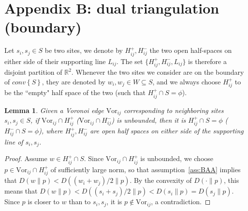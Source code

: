 \documentclass[11pt]{article}
\newtheorem{lemma}{Lemma}
\newcommand{\Sites}{S}
\newcommand{\Vor}{\text{Vor}}
\newcommand{\D}[2]{D\left(#1 \parallel #2\right)}
\newcommand{\CHS}{{conv}\left\{\Sites\right\}}
\begin{document}
\section*{Appendix B: dual triangulation (boundary)}\label{app:boundary}

Let $s_i,s_j\in\Sites$ be two sites, we denote by $H^{+}_{ij},H^{-}_{ij}$ 
	the two open half-spaces on either side of their supporting line $L_{ij}$. 
The set $\{H^{+}_{ij},H^{-}_{ij},L_{ij}\}$ is therefore a disjoint partition of $\mathbb{R}^2$.
Whenever the two sites we consider are on the boundary of $\CHS$, 
	they are denoted by $w_i,w_j\in W\subseteq\Sites$, 
	and we always choose $H^{+}_{ij}$ to be the ``empty" half space of the two 
	(such that $H^{+}_{ij} \cap \Sites =\phi$). 


\begin{lemma}\label{lem:halfspace}
    Given a Voronoi edge $\Vor_{ij}$ 
    	corresponding to neighboring sites $s_i,s_j\in\Sites$, if $\Vor_{ij}\cap  H^{+}_{ij}$ ($\Vor_{ij}\cap  H^{-}_{ij}$) is unbounded, then it is $ H^{+}_{ij}\cap \Sites=\phi$
 ($ H^{-}_{ij}\cap \Sites=\phi$), 
where $H^{+}_{ij},H^{-}_{ij}$ are open half spaces on either side of the
supporting line of $s_i,s_j$. 
\end{lemma}
\begin{proof}
Assume $w\in H^{+}_{ij}\cap \Sites$. 
Since $\Vor_{ij}\cap H^{+}_{ij}$ is unbounded, 
we choose $p\in \Vor_{ij}\cap H^{+}_{ij}$ of sufficiently large norm, 
	so that assumption~\ref{ass:BAA} implies that $\D{w}{p} < \D{(w_i+w_j)/2}{p}$. 
By the convexity of $\D{\cdot}{p}$, this means that $\D{w}{p} < \D{(s_i+s_j)/2}{p} <
\D{s_i}{p}=\D{s_j}{p}$. 
Since $p$ is closer to $w$ than to $s_i,s_j$, it is $p\notin \Vor_{ij}$, a
contradiction. 
\end{proof}
\end{document}
